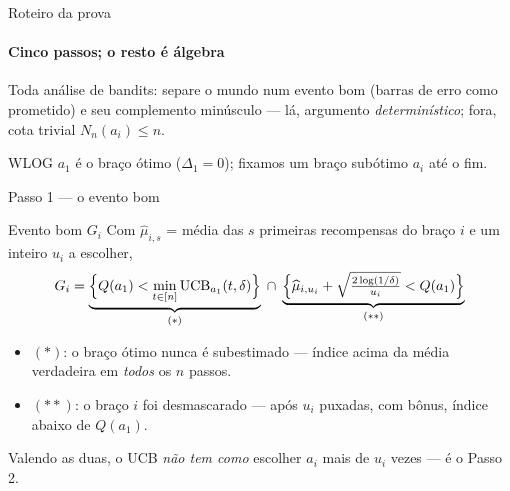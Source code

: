 \documentclass[aspectratio=169, 11pt]{beamer}
\newcommand{\muh}{\widehat{\mu}}
\newcommand{\ucb}{\mathrm{UCB}}
\begin{document}
\begin{frame}{Roteiro da prova}
  \framesubtitle{Cinco passos; o resto é álgebra}

  \begin{center}
  \end{center}

  \begin{ideiabox}
    Toda análise de bandits: separe o mundo num \alert{evento bom} (barras de
    erro como prometido) e seu complemento minúsculo --- lá, argumento
    \emph{determinístico}; fora, cota trivial $N_n(a_i)\le n$.
  \end{ideiabox}

  {\small WLOG $a_1$ é o braço ótimo ($\Delta_1=0$); fixamos um braço
  subótimo $a_i$ até o fim.}
\end{frame}

\begin{frame}{Passo 1 --- o evento bom}
  \begin{defbox}{Evento bom $G_i$}
    Com $\muh_{i,s}$ = média das $s$ primeiras recompensas do braço $i$ e um
    inteiro $u_i$ a escolher,
    \[
      G_i =
      \underbrace{\Bigl\{ Q(a_1) < \min_{t\in[n]} \ucb_{a_1}(t,\delta)\Bigr\}}_{(*)}
      \;\cap\;
      \underbrace{\Bigl\{ \muh_{i,u_i} + \sqrt{\tfrac{2\log(1/\delta)}{u_i}} < Q(a_1)\Bigr\}}_{(**)}
    \]
  \end{defbox}

  {\small
  \begin{itemize}\setlength{\itemsep}{0.2ex}
    \item $(*)$: \alert{o braço ótimo nunca é subestimado} --- índice acima
          da média verdadeira em \emph{todos} os $n$ passos.
    \item $(**)$: \alert{o braço $i$ foi desmascarado} --- após $u_i$
          puxadas, com bônus, índice abaixo de $Q(a_1)$.
  \end{itemize}}

  \vspace{-0.4em}
  \begin{ideiabox}
    Valendo as duas, o UCB \emph{não tem como} escolher $a_i$ mais de $u_i$
    vezes --- é o Passo 2.
  \end{ideiabox}
\end{frame}
\end{document}
